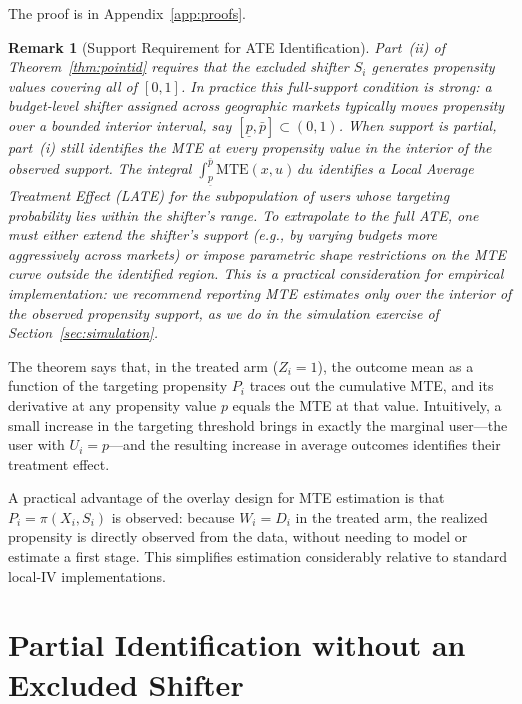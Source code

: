 \documentclass[12pt]{article}
\newtheorem{remark}{Remark}
\newcommand{\MTE}{\mathrm{MTE}}
\begin{document}
\noindent The proof is in Appendix~\ref{app:proofs}.

\begin{remark}[Support Requirement for ATE Identification]
\label{rem:support}
Part~(ii) of Theorem~\ref{thm:pointid} requires that the excluded shifter
$S_i$ generates propensity values covering all of $[0,1]$. In practice
this full-support condition is strong: a budget-level shifter assigned
across geographic markets typically moves propensity over a bounded interior
interval, say $[\underline{p}, \bar{p}] \subset (0,1)$. When support is
partial, part~(i) still identifies the MTE at every propensity value in
the interior of the observed support. The integral $\int_{\underline{p}}^{\bar{p}}
\MTE(x,u)\,du$ identifies a \emph{Local Average Treatment Effect} (LATE)
for the subpopulation of users whose targeting probability lies within the
shifter's range. To extrapolate to the full ATE, one must either extend
the shifter's support (e.g., by varying budgets more aggressively across
markets) or impose parametric shape restrictions on the MTE curve outside
the identified region. This is a practical consideration for empirical
implementation: we recommend reporting MTE estimates only over the interior
of the observed propensity support, as we do in the simulation exercise of
Section~\ref{sec:simulation}.
\end{remark}

The theorem says that, in the treated arm ($Z_i = 1$), the outcome mean as
a function of the targeting propensity $P_i$ traces out the cumulative MTE,
and its derivative at any propensity value $p$ equals the MTE at that value.
Intuitively, a small increase in the targeting threshold brings in exactly the
marginal user---the user with $U_i = p$---and the resulting increase in
average outcomes identifies their treatment effect.

A practical advantage of the overlay design for MTE estimation is that
$P_i = \pi(X_i, S_i)$ is observed: because $W_i = D_i$ in the treated arm,
the realized propensity is directly observed from the data, without needing
to model or estimate a first stage. This simplifies estimation considerably
relative to standard local-IV implementations.

\section{Partial Identification without an Excluded Shifter}
\label{sec:partial}
\end{document}
